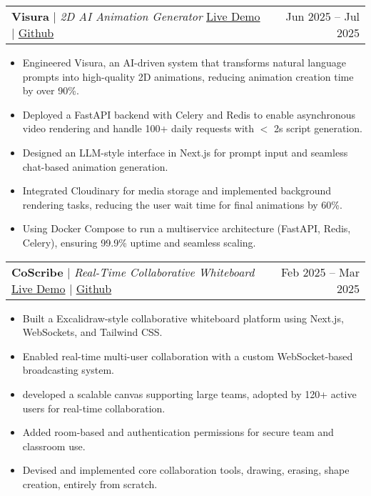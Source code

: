 \documentclass[letterpaper,11pt]{article}\renewcommand{\baselinestretch}{0.95}
\makeatletter
\newcommand{\resumeProjectHeading}[2]{
    \item
    \begin{tabular*}{0.97\textwidth}{l@{\extracolsep{\fill}}r}
      \small#1 & #2 \\
    \end{tabular*}\vspace{-7pt}
}
\makeatother
\begin{document}
    \resumeProjectHeading
           {\large \textbf{Visura} $|$ \emph{2D AI Animation Generator} 
           \href{https://visura.space/}{Live Demo} $|$    \href{https://github.com/Devansh-Sabharwal/visura}{Github}}{Jun 2025 – Jul 2025 } 
\begin{itemize}[leftmargin=0.3in,label={$\bullet$}]
    
    \item Engineered Visura, an AI-driven system that transforms natural language prompts into high-quality 2D animations, reducing animation creation time by over 90\%.
    \item Deployed a FastAPI backend with Celery and Redis to enable asynchronous video rendering and handle 100+ daily requests with $<$ 2s script generation.
    \item Designed an LLM-style interface in Next.js for prompt input and seamless chat-based animation generation.
    \item Integrated Cloudinary for media storage and implemented background rendering tasks, reducing the user wait time for final animations by 60\%.
    \item Using Docker Compose to run a multiservice architecture (FastAPI, Redis, Celery), ensuring 99.9\% uptime and seamless scaling.
\end{itemize}

    
    \resumeProjectHeading
           {\large \textbf{CoScribe} $|$ \emph{Real-Time Collaborative Whiteboard}
           \href{https://coscribe.onrender.com/}{Live Demo} $|$
           \href{https://github.com/Devansh-Sabharwal/CoScribe}{Github}}{Feb 2025 – Mar 2025} 
           \begin{itemize}[label={$\bullet$}]

                \item Built a Excalidraw-style collaborative whiteboard platform using Next.js, WebSockets, and Tailwind CSS.
                \item Enabled real-time multi-user collaboration with a custom WebSocket-based broadcasting system.
                \item developed a scalable canvas supporting large teams, adopted by 120+ active users for real-time collaboration.
                \item Added room-based and authentication permissions for secure team and classroom use.
                \item Devised and implemented core collaboration tools, drawing, erasing, shape creation, entirely from scratch.
                \end{itemize}
                
\end{document}
